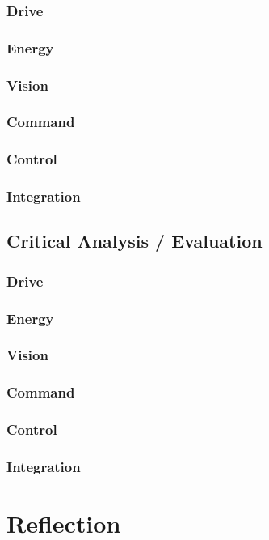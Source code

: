 \documentclass[10pt,twoside]{article}
\begin{document}
\subsubsection{Drive}

\subsubsection{Energy}

\subsubsection{Vision}

\subsubsection{Command}

\subsubsection{Control}

\subsubsection{Integration}

\subsection{Critical Analysis / Evaluation}

\subsubsection{Drive}

\subsubsection{Energy}

\subsubsection{Vision}

\subsubsection{Command}

\subsubsection{Control}

\subsubsection{Integration}

\section{Reflection}

\appendix
\end{document}
